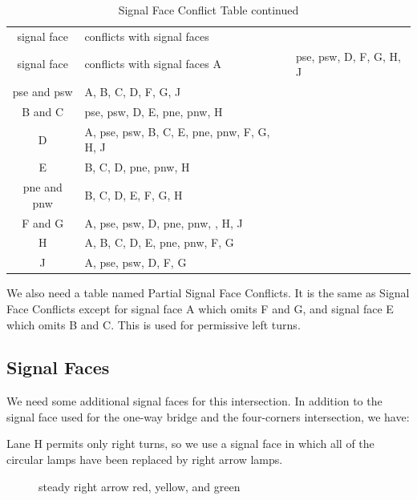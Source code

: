 \documentclass[letterpaper,twoside]{article}
\begin{document}
\begin{longtable}{c | l}
  \caption{Signal Face Conflict Table} \\
  signal face & conflicts with signal faces \endfirsthead
  \caption{Signal Face Conflict Table continued} \\
  signal face & conflicts with signal faces \endhead
  \hline
  A & pse, psw, D, F, G, H, J \\
  pse and psw & A, B, C, D, F, G, J \\
  B and C & pse, psw, D, E, pne, pnw, H \\
  D & A, pse, psw, B, C, E, pne, pnw, F, G, H, J \\
  E & B, C, D, pne, pnw, H \\
  pne and pnw & B, C, D, E, F, G, H \\
  F and G & A, pse, psw, D, pne, pnw, , H, J \\
  H & A, B, C, D, E, pne, pnw, F, G \\
  J & A, pse, psw, D, F, G \\
\end{longtable}

We also need a table named Partial Signal Face Conflicts.  It is the same
as Signal Face Conflicts except for signal face A which omits F and G,
and signal face E which omits B and C.  This is used for permissive
left turns.

\subsection{Signal Faces}

We need some additional signal faces for this intersection.  In addition
to the signal face used for the one-way bridge and the four-corners
intersection, we have:

Lane H permits only right turns, so we use a signal face in which all of
the circular lamps have been replaced by right arrow lamps.

\begin{figure}[H]
           {\caption{steady right arrow red, yellow, and
               green}\label{fig:signal_rrr}}
\end{figure}
\end{document}
